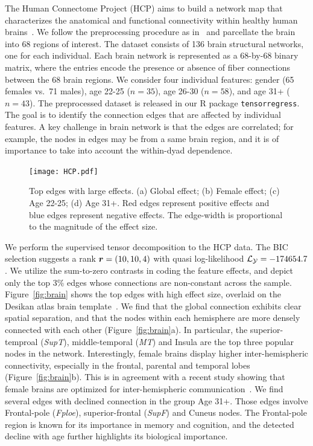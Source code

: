 \documentclass[12pt]{article}
\theoremstyle{definition}
\theoremstyle{definition}
\begin{document}
The Human Connectome Project (HCP) aims to build a network map that characterizes the anatomical and functional connectivity within healthy human brains~\citep{van2013wu}. We follow the preprocessing procedure as in~\citep{desikan2006automated} and parcellate the brain into 68 regions of interest. The dataset consists of 136 brain structural networks, one for each individual. Each brain network is represented as a 68-by-68 binary matrix, where the entries encode the presence or absence of fiber connections between the 68 brain regions. We consider four individual features: gender (65 females vs.\ 71 males), age 22-25 ($n=35$), age 26-30 ($n=58$), and age 31+ ($n=43$). The preprocessed dataset is released in our R package \texttt{tensorregress}. The goal is to identify the connection edges that are affected by individual features. A key challenge in brain network is that the edges are correlated; for example, the nodes in edges may be from a same brain region, and it is of importance to take into account the within-dyad dependence. 

\begin{figure}[!h]
\centering
\texttt{[image: HCP.pdf]}
\caption{Top edges with large effects. (a) Global effect; (b) Female effect; (c) Age 22-25; (d) Age 31+. Red edges represent positive effects and blue edges represent negative effects. The edge-width is proportional to the magnitude of the effect size.
}\label{fig:brain}\label{fig:s1}
\vspace{-.5cm}
\end{figure}


We perform the supervised tensor decomposition to the HCP data. %
The BIC selection suggests a rank $\bm{r}=(10,10,4)$ with quasi log-likelihood $\mathcal{L}_{\mathcal{Y}}=-174654.7$. We utilize the sum-to-zero contrasts in coding the feature effects, and depict only the top 3\% edges whose connections are non-constant across the sample. Figure~\ref{fig:brain} shows the top edges with high effect size, overlaid on the Desikan atlas brain template~\citep{desikan2006automated}. We find that the global connection exhibits clear spatial separation, and that the nodes within each hemisphere are more densely connected with each other (Figure~\ref{fig:brain}a). In particular, the superior-temproal (\emph{SupT}), middle-temporal (\emph{MT}) and Insula are the top three popular nodes in the network. Interestingly, female brains display higher inter-hemispheric connectivity, especially in the frontal, parental and temporal lobes (Figure~\ref{fig:brain}b). This is in agreement with a recent study showing that female brains are optimized for inter-hemispheric communication~\citep{ingalhalikar2014sex}. We find several edges with declined connection in the group Age 31+. Those edges involve Frontal-pole (\emph{Fploe}), superior-frontal (\emph{SupF}) and Cuneus nodes. The Frontal-pole region is known for its importance in memory and cognition, and the detected decline with age further highlights its biological importance. 
\end{document}
